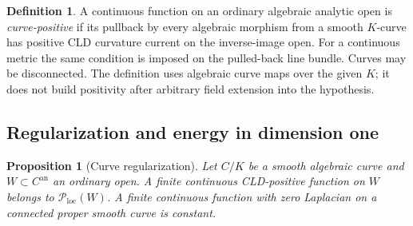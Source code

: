 \documentclass[11pt]{amsart}
\newtheorem{proposition}[theorem]{Proposition}
\theoremstyle{definition}
\newtheorem{definition}[theorem]{Definition}
\theoremstyle{remark}
\numberwithin{equation}{section}
\newcommand{\an}{\mathrm{an}}
\newcommand{\Ploc}{\mathcal P_{\mathrm{loc}}}
\begin{document}
\begin{definition}\label{def:curve-positive}
A continuous function on an ordinary algebraic analytic open is
\emph{curve-positive} if its pullback by every algebraic morphism
from a smooth \(K\)-curve has positive CLD curvature current on the
inverse-image open. For a continuous metric the same condition is
imposed on the pulled-back line bundle. Curves may be disconnected.
The definition uses algebraic curve maps over the given \(K\);
it does not build positivity after arbitrary field extension into
the hypothesis.
\end{definition}

\subsection{Regularization and energy in dimension one}
\begin{proposition}[Curve regularization]\label{prop:curves}
Let \(C/K\) be a smooth algebraic curve and \(W\subset C^\an\)
an ordinary open. A finite continuous CLD-positive function on \(W\)
belongs to \(\Ploc(W)\). A finite continuous function with zero
Laplacian on a connected proper smooth curve is constant.
\end{proposition}
\end{document}
